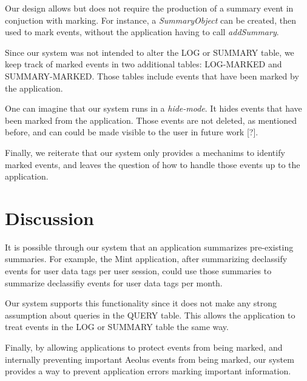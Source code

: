 Our design allows but does not require the production of a summary event in conjuction with marking. For instance, a \emph{SummaryObject} can be created, then used to mark events, without the application having to call \emph{addSummary}.

Since our system was not intended to alter the LOG or SUMMARY table, we keep track of marked events in two additional tables: LOG-MARKED and SUMMARY-MARKED. Those tables include events that have been marked by the application.

One can imagine that our system runs in a \emph{hide-mode}. It hides events that have been marked from the application. Those events are not deleted, as mentioned before, and can could be made visible to the user in future work [?].

Finally, we reiterate that our system only provides a mechanims to identify marked events, and leaves the question of how to handle those events up to the application.




\section{Discussion}

It is possible through our system that an application summarizes pre-existing summaries. For example, the Mint application, after summarizing declassify events for user data tags per user session, could use those summaries to summarize declassifiy events for user data tags per month.

Our system supports this functionality since it does not make any strong assumption about queries in the QUERY table. This allows the application to treat events in the LOG or SUMMARY table the same way.

Finally, by allowing applications to protect events from being marked, and internally preventing important Aeolus events from being marked, our system provides a way to prevent application errors marking important information.
